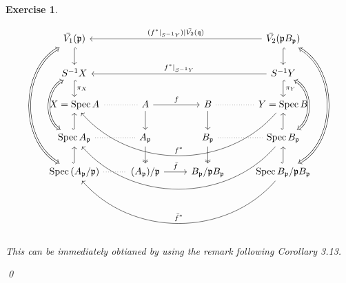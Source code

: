 \documentclass{article}
\theoremstyle{breakstyle}
\newtheorem{exercise}{Exercise}
\DeclareMathOperator{\spec}{Spec}
\begin{document}
\begin{exercise}
\begin{enumerate}[label=({\roman*})]
$$            \begin{tikzcd}
            \bar{V_1}(\mathfrak{p}) \arrow[d, hook]                                                                                             &                                                                  &                                                                    & \bar{V_2}(\mathfrak{p}B_{\mathfrak{p}}) \arrow[d, hook] \arrow[lll, "(f^{*}\mid_{S^{-1}Y})\mid{\bar{V_{2}}(\mathfrak{q}})"']                                      \\
            S^{-1}X \arrow[d, "\pi_X", hook]                                                                                                    &                                                                  &                                                                    & S^{-1}Y \arrow[d, "\pi_Y", hook] \arrow[lll, "f^*\mid_{S^{-1}Y}"']                                                                                                \\
            X=\spec{A}                                                                                                                          & A \arrow[d] \arrow[r, "f"] \arrow[l, no head, dotted]            & B \arrow[d] \arrow[r, no head, dotted]                             & Y=\spec{B} \arrow[lll, "f^*"', bend left=49]                                                                                                                      \\
            \spec{A_{\mathfrak{p}}} \arrow[u, hook] \arrow[uu, no head, Leftrightarrow, bend left=60]                                               & A_{\mathfrak{p}} \arrow[l, no head, dotted] \arrow[d, two heads] & B_{\mathfrak{p}} \arrow[r, no head, dotted] \arrow[d, two heads]   & \spec{B_{\mathfrak{p}}} \arrow[lll, bend left=49] \arrow[uu, no head, Leftrightarrow, bend right=60] \arrow[u, hook]                                                  \\
            \spec{(A_{\mathfrak{p}} / \mathfrak{p})} \arrow[u, hook] \arrow[r, no head, dotted] \arrow[uuuu, no head, Leftrightarrow, bend left=60] & (A_{\mathfrak{p}}) / \mathfrak{p} \arrow[r, "\bar{f}"]           & B_{\mathfrak{p}} / \mathfrak{p}B_{\mathfrak{p}} \arrow[r, phantom] & \spec{B_{\mathfrak{p}} / \mathfrak{p}B_{\mathfrak{p}}} \arrow[lll, "\bar{f}^{*}"', bend left=49] \arrow[u, hook] \arrow[uuuu, no head, Leftrightarrow, bend right=60]
            \end{tikzcd}
            $$
            This can be immediately obtianed by using the remark following \emph{Corollary 3.13}.
    \end{enumerate}
    \qed
\end{exercise}
\end{document}
